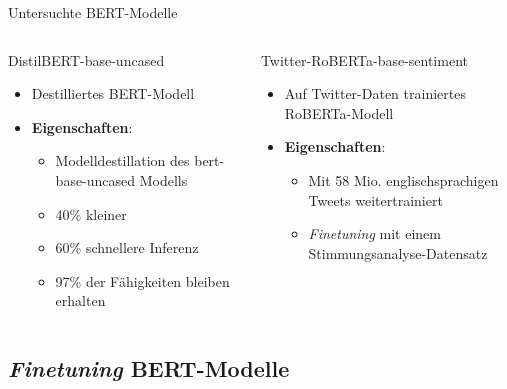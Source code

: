 \documentclass[aspectratio=169]{beamer} %
\begin{document}
\begin{frame}{Untersuchte BERT-Modelle}
\begin{columns}[T]
    \begin{block}{DistilBERT-base-uncased}
    \begin{itemize}
    \item Destilliertes BERT-Modell
    \item \textbf{Eigenschaften}:
      \begin{itemize}
      \item Modelldestillation des bert-base-uncased Modells
      \item 40\% kleiner
      \item 60\% schnellere Inferenz
      \item 97\% der Fähigkeiten bleiben erhalten
      \end{itemize}
    \end{itemize}
    \vspace{0.04cm}
    \end{block}
    \begin{block}{Twitter-RoBERTa-base-sentiment}
        \begin{itemize}
        \item Auf Twitter-Daten trainiertes RoBERTa-Modell
        \item \textbf{Eigenschaften}:
          \begin{itemize}
          \item Mit 58 Mio. englischsprachigen Tweets weitertrainiert
          \item \textit{Finetuning} mit einem Stimmungsanalyse-Datensatz
          \end{itemize}
        \end{itemize}
        \vfill
    \end{block}
\end{columns}
\end{frame}


\subsection{\textit{Finetuning} BERT-Modelle}
\end{document}
